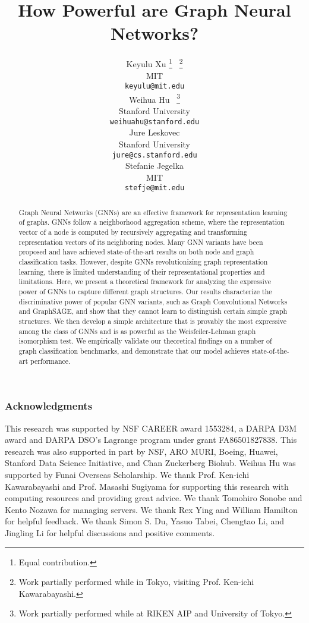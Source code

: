 \documentclass{article} %
\title{How Powerful are Graph Neural Networks?}
\author{Keyulu Xu  \thanks{Equal contribution.} \ \thanks{Work partially performed while in Tokyo, visiting Prof. Ken-ichi Kawarabayashi.} \\
MIT\\
\texttt{keyulu@mit.edu} \\
\And
Weihua Hu \footnotemark[1] \ \thanks{Work partially performed while at RIKEN AIP and University of Tokyo.} \\
Stanford University \\
\texttt{weihuahu@stanford.edu} \\
\And
Jure Leskovec\\
Stanford University \\
\texttt{jure@cs.stanford.edu}\\
\And
Stefanie Jegelka\\
MIT\\
\texttt{stefje@mit.edu} \\
}
\numberwithin{equation}{section}
\theoremstyle{plain}
\theoremstyle{definition}
\theoremstyle{remark}
\begin{document}
\maketitle

\begin{abstract}
Graph Neural Networks (GNNs) are an effective framework for representation learning of graphs. GNNs follow a neighborhood aggregation scheme, where the representation vector of a node is computed by recursively aggregating and transforming representation vectors of its neighboring nodes. Many GNN variants have been proposed and have achieved state-of-the-art results on both node and graph classification tasks. 
However, despite GNNs revolutionizing graph representation learning, there is limited understanding of  their representational properties and limitations.
%
Here, we present a theoretical framework for analyzing the expressive power of GNNs to capture different graph structures. Our results characterize the discriminative power of popular GNN variants, such as Graph Convolutional Networks and GraphSAGE, and show that they cannot learn to distinguish certain simple graph structures. 
We  then develop a simple architecture that is provably the most expressive among the class of GNNs and is as powerful as the Weisfeiler-Lehman graph isomorphism test. 
We empirically validate our theoretical findings on a number of graph classification benchmarks, and demonstrate that our model achieves state-of-the-art performance.
\end{abstract}

















\subsubsection*{Acknowledgments}
This research was supported by NSF CAREER award 1553284, a DARPA D3M award and DARPA DSO’s Lagrange program under grant FA86501827838. This research was also supported in part by
NSF, ARO MURI, 
Boeing, Huawei, Stanford Data Science Initiative,
and Chan Zuckerberg Biohub. 
Weihua Hu was supported by Funai Overseas Scholarship. We thank Prof. Ken-ichi Kawarabayashi and Prof. Masashi Sugiyama for supporting this research with computing resources and providing great advice. We thank Tomohiro Sonobe and Kento Nozawa for managing servers. We thank Rex Ying and William Hamilton for helpful feedback. We thank Simon S. Du, Yasuo Tabei, Chengtao Li, and Jingling Li for helpful discussions and positive comments.






\end{document}
